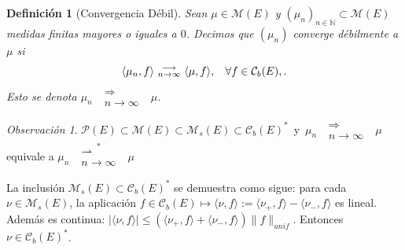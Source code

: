 \documentclass[letterpaper,11pt]{article} %
\def\espacio{\hspace{.25cm}\,}
\theoremstyle{defbreak}
\newtheorem{definition}{Definición}[subsection]
\theoremstyle{propbreak}
\theoremstyle{remark}
\newtheorem{remark}{Observación}[subsection]
\theoremstyle{break}
\begin{document}
\begin{definition}[Convergencia Débil]
Sean $\mu\in \mathcal{M}(E)$ y $(\mu_n)_{n \in \mathbb{N}}\subset \mathcal{M}(E)$ medidas finitas mayores o iguales a $0$. Decimos que $(\mu_n)$ converge débilmente a $\mu$ si 
$$\langle \mu_n,f\rangle \mbox{ }\substack{\longrightarrow \\ n\to\infty}\mbox{ } \langle \mu,f \rangle, \espacio \forall f \in \mathcal{C}_b(E), .$$
Esto se denota $\mu_n \mbox{ }\substack{\Longrightarrow \\n \to \infty}\mbox{ } \mu$.
\end{definition}
\begin{remark}
$\mathcal{P}(E)\subset \mathcal{M}(E) \subset \mathcal{M}_s(E) \subset\mathcal{C}_b(E)^*$ \espacio y \espacio$\mu_n \mbox{ }\substack{\Longrightarrow \\n \to \infty}\mbox{ } \mu$ equivale a $\displaystyle \mu_n \mbox{ }\overset{\ast}{\substack{\rightharpoonup\\n \to\infty}} \mbox{ }\mu$

La inclusión $\mathcal{M}_s(E) \subset\mathcal{C}_b(E)^*$ se demuestra como sigue: para cada $\nu\in\mathcal{M}_s(E)$, la aplicación $f\in\mathcal{C}_b(E)\mapsto\langle \nu,f\rangle:=\langle \nu_+,f\rangle-\langle \nu_-,f\rangle$ es lineal. Además es continua: $|\langle\nu,f\rangle|\leq (\langle \nu_+,f\rangle+\langle \nu_-,f\rangle)\|f\|_{unif}$. Entonces $\nu\in\mathcal{C}_b(E)^*$.
\end{remark}
\end{document}
